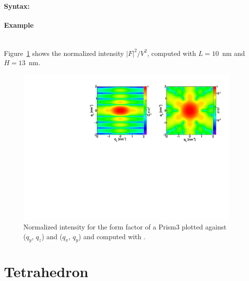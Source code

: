 \paragraph{Syntax:} 

\paragraph{Example}\mbox{}\\
Figure~\ref{fig:FFprism3Ex} shows the normalized intensity
$|F|^2/V^2$, computed with $L=10$~nm and \mbox{$H=13$~nm.}
\begin{figure}[ht]
\begin{center}
\includegraphics[angle=-90,width=\textwidth]{Figures/ff/figffprism3.pdf}
\end{center}
\caption{Normalized intensity for the form factor of a Prism3
 plotted against ($q_y$, $q_z$) and  ($q_x$, $q_y$) and
  computed with .}
\label{fig:FFprism3Ex}
\end{figure}


\newpage
\section{Tetrahedron}   
 
